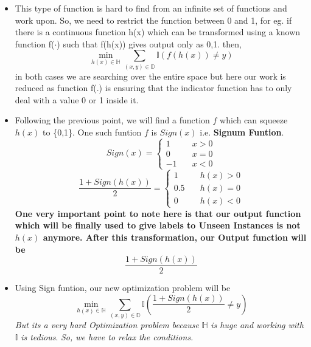 \documentclass[11pt, twosides]{article}
\begin{document}
\begin{itemize}
\begin{itemize}
    \end{itemize}
    \item This type of function is hard to find from an infinite set of functions and work upon. So, we need to restrict the function between 0 and 1, 
    for eg. if there is a continuous function h(x) which can be transformed using a known function f($\cdot$) such that f(h(x)) gives output only as 0,1.
    then,
    $$\min_{h(x)\in \mathbb{H}} \sum_{(x,y)\in \mathbb{D}}{\mathbb{I}(f(h(x))\ne y)}$$
    in both cases we are searching over the entire space but here our work is reduced as function f(.) is ensuring that the indicator function has to only deal with a value 0 or 1 inside it.
     \item Following the previous point, we will find  a function $f$ which can squeeze $h(x)$ to \{0,1\}.
    One such funtion $f$ is $Sign(x)$ i.e. \textbf{Signum Funtion}.
    \begin{equation*}
 Sign(x) =  \left\{
        \begin{array}{ll}
             1 & \quad x > 0 \\
             0 & \quad x = 0\\
            -1 & \quad x < 0
        \end{array}
    \right.
\end{equation*}
\begin{equation*}
 {{\frac{1+Sign(h(x))}{2}}} =  \left\{
        \begin{array}{ll}
             1 & \quad h(x) > 0 \\
            0.5 & \quad h(x) = 0\\
            0 & \quad h(x) < 0
        \end{array}
    \right.
\end{equation*}
\textbf{One very important point to note here is that our output function which will be finally used to give labels to Unseen Instances is not $h(x)$ anymore. After this transformation, our Output function will be $${{\frac{1+Sign(h(x))}{2}}}$$ }
    \item Using Sign funtion, our new optimization problem will be 
    $$\min_{h(x)\in \mathbb{H}} \sum_{(x,y)\in \mathbb{D}}{\mathbb{I}\left({\frac{1+Sign(h(x))}{2}}\ne y\right)}$$
    \textit{But its a very hard Optimization problem because} $\mathbb{H}$ \textit{is huge and working with} $\mathbb{I}$ \textit{is tedious}. \textit{So, we have to relax the conditions.}
    

\end{itemize}
\end{document}
